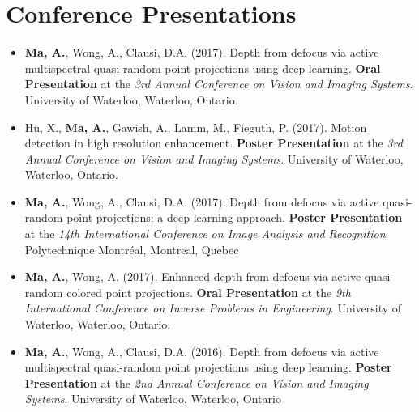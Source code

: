 \section*{Conference Presentations}
\vspace{\postsubhead}
\begin{adjustwidth}{\indentleft}{\indentright}
 \begin{itemize}
    \item \textbf{Ma, A.}, Wong, A., Clausi, D.A. (2017). Depth from defocus via active multispectral quasi-random point projections using deep learning. \textbf{Oral Presentation} at the \emph{3rd Annual Conference on Vision and Imaging Systems}. University of Waterloo, Waterloo, Ontario.
    
    \item Hu, X., \textbf{Ma, A.}, Gawish, A., Lamm, M., Fieguth, P. (2017). Motion detection in high resolution enhancement. \textbf{Poster Presentation} at the \emph{3rd Annual Conference on Vision and Imaging Systems}. University of Waterloo, Waterloo, Ontario.
    
    \item \textbf{Ma, A.}, Wong, A., Clausi, D.A. (2017). Depth from defocus via active quasi-random point projections: a deep learning approach. \textbf{Poster Presentation} at the \emph{14th International Conference on Image Analysis and Recognition}. Polytechnique Montréal, Montreal, Quebec
    
    \item \textbf{Ma, A.}, Wong, A. (2017). Enhanced depth from defocus via active quasi-random colored point projections. \textbf{Oral Presentation} at the \emph{9th International Conference on Inverse Problems in Engineering}. University of Waterloo, Waterloo, Ontario.
    
    \item \textbf{Ma, A.}, Wong, A., Clausi, D.A. (2016). Depth from defocus via active multispectral quasi-random point projections using deep learning. \textbf{Poster Presentation} at the \emph{2nd Annual Conference on Vision and Imaging Systems}. University of Waterloo, Waterloo, Ontario
\end{itemize}
\end{adjustwidth}

